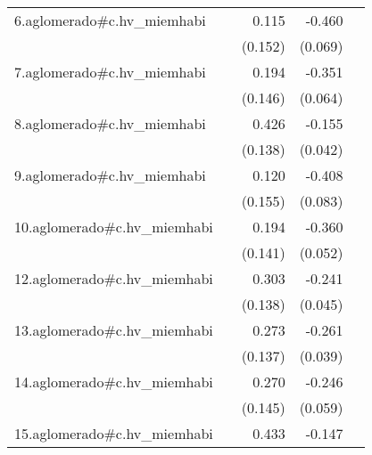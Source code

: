 {\begin{longtable}{l*{4}{D{.}{.}{-1}}}
\addlinespace
6.aglomerado#c.hv\_miemhabi&                     &       0.115         &      -0.460\sym{***}&                     \\
            &                     &     (0.152)         &     (0.069)         &                     \\
\addlinespace
7.aglomerado#c.hv\_miemhabi&                     &       0.194         &      -0.351\sym{***}&                     \\
            &                     &     (0.146)         &     (0.064)         &                     \\
\addlinespace
8.aglomerado#c.hv\_miemhabi&                     &       0.426\sym{**} &      -0.155\sym{***}&                     \\
            &                     &     (0.138)         &     (0.042)         &                     \\
\addlinespace
9.aglomerado#c.hv\_miemhabi&                     &       0.120         &      -0.408\sym{***}&                     \\
            &                     &     (0.155)         &     (0.083)         &                     \\
\addlinespace
10.aglomerado#c.hv\_miemhabi&                     &       0.194         &      -0.360\sym{***}&                     \\
            &                     &     (0.141)         &     (0.052)         &                     \\
\addlinespace
12.aglomerado#c.hv\_miemhabi&                     &       0.303\sym{*}  &      -0.241\sym{***}&                     \\
            &                     &     (0.138)         &     (0.045)         &                     \\
\addlinespace
13.aglomerado#c.hv\_miemhabi&                     &       0.273\sym{*}  &      -0.261\sym{***}&                     \\
            &                     &     (0.137)         &     (0.039)         &                     \\
\addlinespace
14.aglomerado#c.hv\_miemhabi&                     &       0.270         &      -0.246\sym{***}&                     \\
            &                     &     (0.145)         &     (0.059)         &                     \\
\addlinespace
15.aglomerado#c.hv\_miemhabi&                     &       0.433\sym{**} &      -0.147\sym{*}  &                     \\

\end{longtable}}
